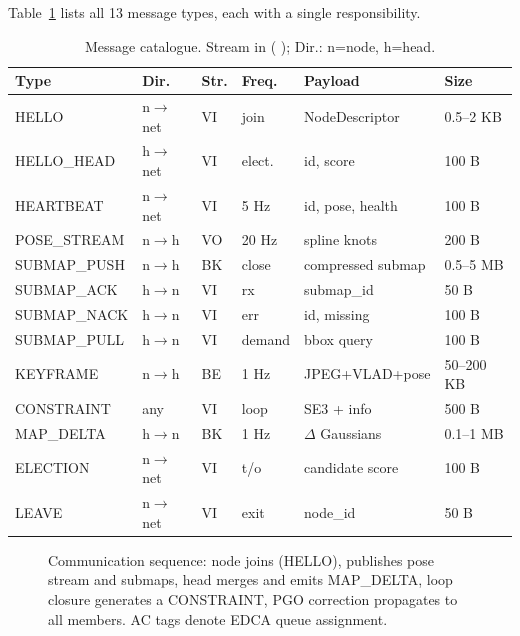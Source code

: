 Table~\ref{tab:messages} lists all 13 message types, each with a single
responsibility.

\begin{table}[t]
  \centering
  \caption{Message catalogue. Stream in ( ); Dir.: n=node, h=head.}
  \label{tab:messages}
  \footnotesize
  \setlength{\tabcolsep}{2pt}
  \begin{tabular}{@{}p{1.5cm}p{1.2cm}p{0.8cm}p{1.0cm}p{1.9cm}p{1.0cm}@{}}
    \toprule
    Type & Dir. & Str. & Freq. & Payload & Size \\
    \midrule
    HELLO         & n$\to$net & VI & join   & NodeDescriptor     & 0.5--2 KB \\
    HELLO\_HEAD   & h$\to$net & VI & elect. & id, score          & 100 B \\
    HEARTBEAT     & n$\to$net & VI & 5 Hz   & id, pose, health   & 100 B \\
    POSE\_STREAM  & n$\to$h   & VO & 20 Hz  & spline knots       & 200 B \\
    SUBMAP\_PUSH  & n$\to$h   & BK & close  & compressed submap  & 0.5--5 MB \\
    SUBMAP\_ACK   & h$\to$n   & VI & rx     & submap\_id         & 50 B \\
    SUBMAP\_NACK  & h$\to$n   & VI & err    & id, missing        & 100 B \\
    SUBMAP\_PULL  & h$\to$n   & VI & demand & bbox query         & 100 B \\
    KEYFRAME      & n$\to$h   & BE & 1 Hz   & JPEG+VLAD+pose     & 50--200 KB \\
    CONSTRAINT    & any       & VI & loop   & SE3 + info         & 500 B \\
    MAP\_DELTA    & h$\to$n   & BK & 1 Hz   & $\Delta$ Gaussians & 0.1--1 MB \\
    ELECTION      & n$\to$net & VI & t/o    & candidate score    & 100 B \\
    LEAVE         & n$\to$net & VI & exit   & node\_id           & 50 B \\
    \bottomrule
  \end{tabular}
\end{table}

\begin{figure}[t]
  \centering
  \resizebox{\columnwidth}{!}{}
  \caption{Communication sequence: node joins (HELLO), publishes pose stream
  and submaps, head merges and emits MAP\_DELTA, loop closure generates a
  CONSTRAINT, PGO correction propagates to all members. AC tags denote EDCA
  queue assignment.}
  \label{fig:sequence}
\end{figure}
